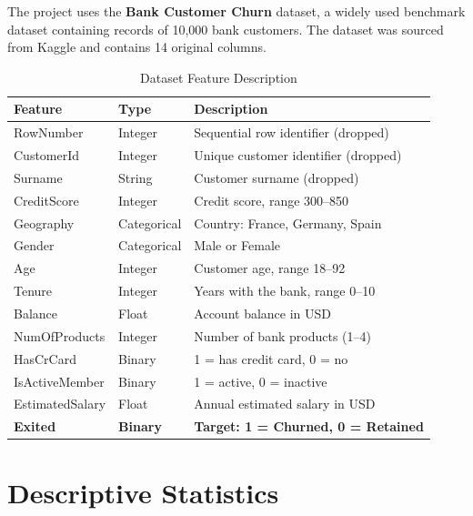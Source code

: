 \documentclass[12pt, a4paper]{report}
\begin{document}
The project uses the \textbf{Bank Customer Churn} dataset, a widely used benchmark dataset containing records of 10,000 bank customers. The dataset was sourced from Kaggle and contains 14 original columns.

\begin{table}[H]
\centering
\caption{Dataset Feature Description}
\label{tab:features}
\begin{tabularx}{\textwidth}{l l X}
\toprule
\textbf{Feature} & \textbf{Type} & \textbf{Description} \\
\midrule
RowNumber & Integer & Sequential row identifier (dropped) \\
CustomerId & Integer & Unique customer identifier (dropped) \\
Surname & String & Customer surname (dropped) \\
CreditScore & Integer & Credit score, range 300--850 \\
Geography & Categorical & Country: France, Germany, Spain \\
Gender & Categorical & Male or Female \\
Age & Integer & Customer age, range 18--92 \\
Tenure & Integer & Years with the bank, range 0--10 \\
Balance & Float & Account balance in USD \\
NumOfProducts & Integer & Number of bank products (1--4) \\
HasCrCard & Binary & 1 = has credit card, 0 = no \\
IsActiveMember & Binary & 1 = active, 0 = inactive \\
EstimatedSalary & Float & Annual estimated salary in USD \\
\midrule
\textbf{Exited} & \textbf{Binary} & \textbf{Target: 1 = Churned, 0 = Retained} \\
\bottomrule
\end{tabularx}
\end{table}

\section{Descriptive Statistics}
\end{document}
